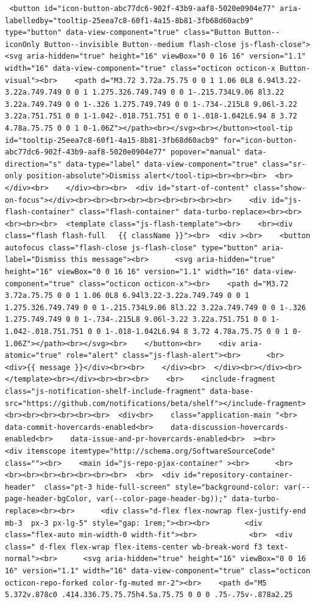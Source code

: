 \documentclass[
  letterpaper,
]{book}
\begin{document}
\begin{verbatim}
 <button id="icon-button-abc77dc6-902f-43b9-aaf8-5020e0904e77" aria-labelledby="tooltip-25eea7c8-60f1-4a15-8b81-3fb68d60acb9" type="button" data-view-component="true" class="Button Button--iconOnly Button--invisible Button--medium flash-close js-flash-close">  <svg aria-hidden="true" height="16" viewBox="0 0 16 16" version="1.1" width="16" data-view-component="true" class="octicon octicon-x Button-visual"><br>    <path d="M3.72 3.72a.75.75 0 0 1 1.06 0L8 6.94l3.22-3.22a.749.749 0 0 1 1.275.326.749.749 0 0 1-.215.734L9.06 8l3.22 3.22a.749.749 0 0 1-.326 1.275.749.749 0 0 1-.734-.215L8 9.06l-3.22 3.22a.751.751 0 0 1-1.042-.018.751.751 0 0 1-.018-1.042L6.94 8 3.72 4.78a.75.75 0 0 1 0-1.06Z"></path><br></svg><br></button><tool-tip id="tooltip-25eea7c8-60f1-4a15-8b81-3fb68d60acb9" for="icon-button-abc77dc6-902f-43b9-aaf8-5020e0904e77" popover="manual" data-direction="s" data-type="label" data-view-component="true" class="sr-only position-absolute">Dismiss alert</tool-tip><br><br><br>  <br></div><br>    </div><br><br>  <div id="start-of-content" class="show-on-focus"></div><br><br><br><br><br><br><br><br><br>    <div id="js-flash-container" class="flash-container" data-turbo-replace><br><br><br><br><br>  <template class="js-flash-template"><br>    <br><div class="flash flash-full   {{ className }}"><br>  <div ><br>    <button autofocus class="flash-close js-flash-close" type="button" aria-label="Dismiss this message"><br>      <svg aria-hidden="true" height="16" viewBox="0 0 16 16" version="1.1" width="16" data-view-component="true" class="octicon octicon-x"><br>    <path d="M3.72 3.72a.75.75 0 0 1 1.06 0L8 6.94l3.22-3.22a.749.749 0 0 1 1.275.326.749.749 0 0 1-.215.734L9.06 8l3.22 3.22a.749.749 0 0 1-.326 1.275.749.749 0 0 1-.734-.215L8 9.06l-3.22 3.22a.751.751 0 0 1-1.042-.018.751.751 0 0 1-.018-1.042L6.94 8 3.72 4.78a.75.75 0 0 1 0-1.06Z"></path><br></svg><br>    </button><br>    <div aria-atomic="true" role="alert" class="js-flash-alert"><br>      <br>      <div>{{ message }}</div><br><br>    </div><br>  </div><br></div><br>  </template><br></div><br><br><br>    <br>    <include-fragment class="js-notification-shelf-include-fragment" data-base-src="https://github.com/notifications/beta/shelf"></include-fragment><br><br><br><br><br><br>  <div<br>    class="application-main "<br>    data-commit-hovercards-enabled<br>    data-discussion-hovercards-enabled<br>    data-issue-and-pr-hovercards-enabled<br>  ><br>        <div itemscope itemtype="http://schema.org/SoftwareSourceCode" class=""><br>    <main id="js-repo-pjax-container" ><br>      <br>      <br><br><br><br><br><br><br>  <br>  <div id="repository-container-header"  class="pt-3 hide-full-screen" style="background-color: var(--page-header-bgColor, var(--color-page-header-bg));" data-turbo-replace><br><br>      <div class="d-flex flex-nowrap flex-justify-end mb-3  px-3 px-lg-5" style="gap: 1rem;"><br><br>        <div class="flex-auto min-width-0 width-fit"><br>            <br>  <div class=" d-flex flex-wrap flex-items-center wb-break-word f3 text-normal"><br>      <svg aria-hidden="true" height="16" viewBox="0 0 16 16" version="1.1" width="16" data-view-component="true" class="octicon octicon-repo-forked color-fg-muted mr-2"><br>    <path d="M5 5.372v.878c0 .414.336.75.75.75h4.5a.75.75 0 0 0 .75-.75v-.878a2.25 
\end{verbatim}
\end{document}
